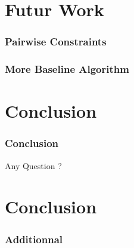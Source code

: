 \documentclass{beamer}
\begin{document}
\section{Futur Work}

\begin{frame}
\frametitle{Pairwise Constraints}
\end{frame}

\begin{frame}
\frametitle{More Baseline Algorithm}
\end{frame}

\section{Conclusion}

\begin{frame}
\frametitle{Conclusion}
\end{frame}

\begin{frame}
Any Question ?
\end{frame}

\section*{Conclusion}

\begin{frame}
\frametitle{Additionnal}
\end{frame}
\end{document}
